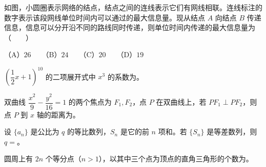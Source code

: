 \begin{question}
如图，小圆圈表示网络的结点，结点之间的连线表示它们有网线相联。连线标注的数字表示该段网线单位时间内可以通过的最大信息量。现从结点 $A$ 向结点 $B$ 传递信息，信息可以分开沿不同的路线同时传递，则单位时间内传递的最大信息量为\mbox{（　　）}
\nopagebreak[4]
\begin{center}\end{center}
\nopagebreak[4]
（A）$26$　　（B）$24$　　（C）$20$　　（D）$19$

\end{question}

\begin{question}
$\left(\dfrac12x+1\right)^{10}$ 的二项展开式中 $x^3$ 的系数为\gkblank{}。

\end{question}
\begin{question}
双曲线 $\dfrac{x^2}{9}-\dfrac{y^2}{16}=1$ 的两个焦点为 $F_1,F_2$，点 $P$ 在双曲线上，若 $PF_1\perp PF_2$，则点 $P$ 到 $x$ 轴的距离为\gkblank{}。

\end{question}
\begin{question}
设 $\{a_n\}$ 是公比为 $q$ 的等比数列，$S_n$ 是它的前 $n$ 项和。若 $\{S_n\}$ 是等差数列，则 $q=$\gkblank{}。

\end{question}
\begin{question}
圆周上有 $2n$ 个等分点（$n>1$），以其中三个点为顶点的直角三角形的个数为\gkblank{}。

\end{question}

